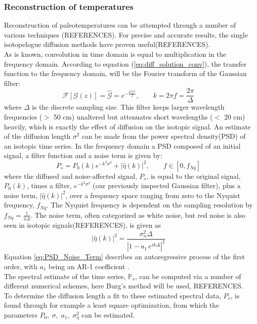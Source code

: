 \documentclass[../../CompleteThesis/Complete_1stDraft.tex]{subfiles}
\begin{document}
\subsubsection{Reconstruction of temperatures}
Reconstruction of paleotemperatures can be attempted through a number of various techniques (REFERENCES). For precise and accurate results, the single isotopelogue diffusion methods have proven useful(REFERENCES).\\
As is known, convolution in time domain is equal to multiplication in the frequency domain. According to equation (\ref{eq:diff_solution_conv}), the transfer function to the frequency domain, will be the Fourier transform of the Gaussian filter:
\begin{equation}
	\mathcal{F}[\mathcal{G}(z)] = \hat{\mathcal{G}} = e^{-\frac{k^2\sigma^2}{2}}, \qquad k = 2\pi f = \frac{2\pi}{\Delta}
	\label{eq:Transer_Fct}
\end{equation} 
where $\Delta$ is the discrete sampling size. This filter keeps larger wavelength frequencies ($>$ 50 cm) unaltered but attenuates short wavelengths ($<$ 20 cm) heavily, which is exactly the effect of diffusion on the isotopic signal. An estimate of the diffusion length $\sigma^2$ can be made from the power spectral density(PSD) of an isotopic time series. In the frequency domain a PSD composed of an initial signal, a filter function and a noise term is given by:
\begin{equation}
	P_s = P_0(k) e^{-k^2\sigma^2} + |\hat{\eta}(k)|^2, \qquad f \in [0, f_{Nq}]
	\label{eq:PSD_general}
\end{equation} 
where the diffused and noise-affected signal, $P_s$, is equal to the original signal, $P_0(k)$, times a filter, $e^{-k^2\sigma^2}$ (our previously inspected Gaussian filter), plus a noise term, $|\hat{\eta}(k)|^2$, over a frequency space ranging from zero to the Nyquist frequency, $f_{Nq}$. The Nyquist frequency is dependent on the sampling resolution by $f_{Nq} = \frac{1}{2\Delta}$.
The noise term, often categorized as white noise, but red noise is also seen in isotopic signals(REFERENCES), is given as
\begin{equation}
	|\hat{\eta}(k)|^2 = \frac{\sigma_n^2 \Delta}{|1 - a_1 \, e^{ik\Delta}|^2}
	\label{eq:PSD_Noise_Term}
\end{equation}
Equation \ref{eq:PSD_Noise_Term} describes an autoregressive process of the first order, with $a_1$ being an AR-1 coefficient .\\
The spectral estimate of the time series, $\mathbb{P}_s$, can be computed via a number of different numerical schemes, here Burg's method will be used, REFERENCES. To determine the diffusion length a fit to these estimated spectral data, $P_s$, is found through for example a least square optimization, from which the parameters $P_0, \; \sigma, \; a_1, \; \sigma_{\eta}^2$ can be estimated.\\
\end{document}
